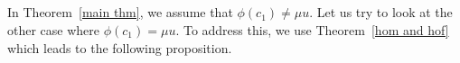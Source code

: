 \documentclass{amsart}
\newcommand{\thmref}[1]{Theorem~\ref{#1}}
\begin{document}
	
	
	\subsection{} In \thmref{main thm}, we assume that $\phi(c_1) \neq \mu u$. Let us try to look at the %
other case where $\phi(c_1) = \mu u$. %
To address this, we %
use  \thmref{hom and hof} which %
leads %
to the following proposition.
	
\end{document}
